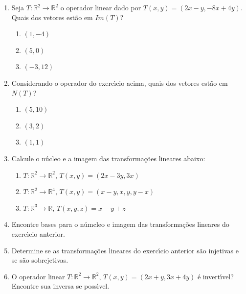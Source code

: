 \documentclass[a4paper,5pt]{amsbook}
\begin{document}
\vspace{1cm}
\begin{enumerate}
	\vspace{0.5cm}
    \item Seja $T:\mathbb{R}^2\rightarrow\mathbb{R}^2$ o operador linear dado por
        $T(x,y)=(2x-y,-8x+4y)$. Quais dos vetores est\~ao em $Im(T)$?
        \begin{enumerate}
            \item $(1,-4)$
            \item $(5,0)$
            \item $(-3,12)$
        \end{enumerate}

    \vspace{0.5cm}
    \item Considerando o operador do exerc\'{\i}cio acima, quais dos vetores est\~ao
        em $N(T)$?
        \begin{enumerate}
            \item $(5,10)$
            \item $(3,2)$
            \item $(1,1)$
        \end{enumerate}

	\vspace{0.5cm}
	\item Calcule o n\'ucleo e a imagem das transforma\c{c}\~oes lineares abaixo:
		\begin{enumerate}
			\item $T:\mathbb{R}^2 \rightarrow \mathbb{R}^2$,
				$T(x,y) = (2x-3y, 3x)$
			\item $T:\mathbb{R}^2 \rightarrow \mathbb{R}^4$,
				$T(x,y) = (x-y, x, y, y - x)$
			\item $T:\mathbb{R}^3 \rightarrow \mathbb{R}$,
				$T(x,y,z) = x - y + z$
		\end{enumerate}

    \vspace{0.5cm}
    \item Encontre bases para o n\'umcleo e imagem das transforma\c{c}\~oes lineares do
        exerc\'{\i}cio anterior.

	\vspace{0.5cm}
	\item Determine se as transforma\c{c}\~oes lineares do exerc\'{\i}cio anterior s\~ao
		injetivas e se s\~ao sobrejetivas.

	\vspace{0.5cm}
	\item O operador linear $T:\mathbb{R}^2 \rightarrow \mathbb{R}^2$, $T(x,y)
		= (2x+y, 3x+4y)$ \'e invert\'{\i}vel? Encontre sua inversa se poss\'{\i}vel.

\end{enumerate}
\end{document}
